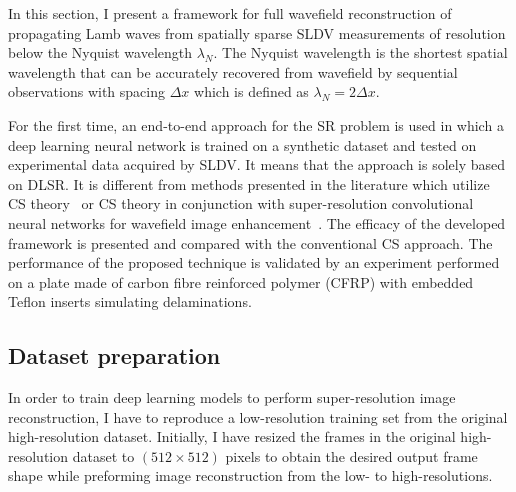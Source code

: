 
In this section, I present a framework for full wavefield reconstruction of propagating Lamb waves from spatially sparse SLDV measurements of resolution below the Nyquist wavelength $\lambda_N$. 
The Nyquist wavelength is the shortest spatial wavelength that can be accurately recovered from wavefield by sequential observations with spacing $\Delta x$ which is defined as $\lambda_N = 2 \Delta x$. 

For the first time, an end-to-end approach for the SR problem is used in which a deep learning neural network is trained on a synthetic dataset and tested on experimental data acquired by SLDV.
It means that the approach is solely based on DLSR.
It is different from methods presented in the literature which utilize CS theory~\cite{Harley2013, KeshmiriEsfandabadi2018} or CS theory in conjunction with super-resolution convolutional neural networks for wavefield image enhancement~\cite{Park2017a, KeshmiriEsfandabadi2020}.
The efficacy of the developed framework is presented and compared with the conventional CS approach.
The performance of the proposed technique is validated by an experiment performed on a plate made of carbon fibre reinforced polymer (CFRP) with embedded Teflon inserts simulating delaminations.

\subsection{Dataset preparation}
\label{sec451}
In order to train deep learning models to perform super-resolution image reconstruction, I have to reproduce a low-resolution training set from the original high-resolution dataset. 
Initially, I have resized the frames in the original high-resolution dataset to \((512\times512)\) pixels to obtain the desired output frame shape while preforming image reconstruction from the low- to high-resolutions.

